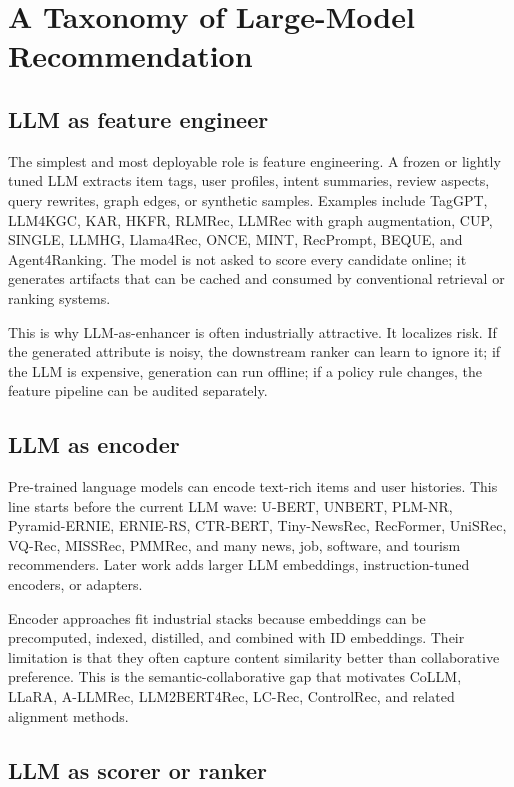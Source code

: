 \documentclass[11pt]{article}
\begin{document}
\section{A Taxonomy of Large-Model Recommendation}

\subsection{LLM as feature engineer}

The simplest and most deployable role is feature engineering. A frozen or lightly tuned LLM extracts item tags, user profiles, intent summaries, review aspects, query rewrites, graph edges, or synthetic samples. Examples include TagGPT, LLM4KGC, KAR, HKFR, RLMRec, LLMRec with graph augmentation, CUP, SINGLE, LLMHG, Llama4Rec, ONCE, MINT, RecPrompt, BEQUE, and Agent4Ranking. The model is not asked to score every candidate online; it generates artifacts that can be cached and consumed by conventional retrieval or ranking systems.

This is why LLM-as-enhancer is often industrially attractive. It localizes risk. If the generated attribute is noisy, the downstream ranker can learn to ignore it; if the LLM is expensive, generation can run offline; if a policy rule changes, the feature pipeline can be audited separately.

\subsection{LLM as encoder}

Pre-trained language models can encode text-rich items and user histories. This line starts before the current LLM wave: U-BERT, UNBERT, PLM-NR, Pyramid-ERNIE, ERNIE-RS, CTR-BERT, Tiny-NewsRec, RecFormer, UniSRec, VQ-Rec, MISSRec, PMMRec, and many news, job, software, and tourism recommenders. Later work adds larger LLM embeddings, instruction-tuned encoders, or adapters.

Encoder approaches fit industrial stacks because embeddings can be precomputed, indexed, distilled, and combined with ID embeddings. Their limitation is that they often capture content similarity better than collaborative preference. This is the semantic-collaborative gap that motivates CoLLM, LLaRA, A-LLMRec, LLM2BERT4Rec, LC-Rec, ControlRec, and related alignment methods.

\subsection{LLM as scorer or ranker}
\end{document}
